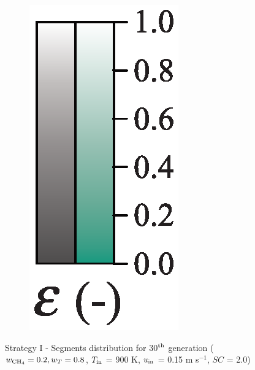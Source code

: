 \documentclass[preprint,12pt]{elsarticle}
\begin{document}
\begin{figure}
\begin{subfigure}[b]{0.1\textwidth}
     	\includegraphics[width=\textwidth]{segments_porosity.eps}
     \end{subfigure}
\caption{\label{fig:30L2080-seg} Strategy I - Segments distribution for 30$^{\rm{th}}$ generation ($w_{\rm{CH_4}} = 0.2, w_T = 0.8$, 	$T_{\rm{in}}$ = 900 K, $u_{\rm{in}}$ = 0.15 m s$^{-1}$, $SC$ = 2.0)}
\end{figure}
\end{document}
